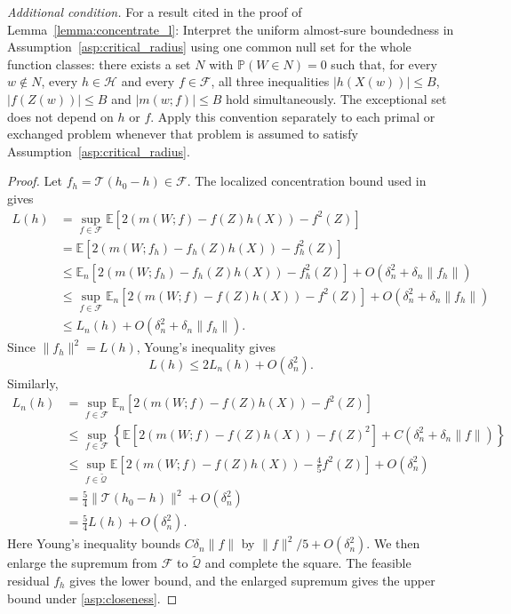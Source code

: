 \emph{Additional condition.} For a result cited in the proof of Lemma~\ref{lemma:concentrate_l}: Interpret the uniform almost-sure boundedness in Assumption~\ref{asp:critical_radius} using one common null set for the whole function classes: there exists a set $N$ with $\mathbb P(W\in N)=0$ such that, for every $w\notin N$, every $h\in\mathcal H$ and every $f\in\mathcal F$, all three inequalities $|h(X(w))|\leqslant B$, $|f(Z(w))|\leqslant B$ and $|m(w;f)|\leqslant B$ hold simultaneously. The exceptional set does not depend on $h$ or $f$. Apply this convention separately to each primal or exchanged problem whenever that problem is assumed to satisfy Assumption~\ref{asp:critical_radius}.
\begin{proof}
Let $f_h=\mathcal T(h_0-h)\in\mathcal F$.
The localized concentration bound used in \citet[Lemma~9]{bennett2023source}
gives
\begin{align*}
L( h) &=\sup_{f\in \mathcal{F}}\mathbb{E}\left[ 2( m( W;f) -f( Z) h( X)) -f^{2}( Z)\right] \\
& =\mathbb{E}\left[ 2( m( W;f_{h}) -f_{h}( Z) h( X)) -f_{h}^{2}( Z)\right]\\
 & \leqslant \mathbb{E}_{n}\left[ 2( m( W;f_{h}) -f_{h}( Z) h( X)) -f_{h}^{2}( Z)\right] +O\left( \delta _{n}^{2} +\delta _{n} \| f_{h} \| \right)\\
 & \leqslant \sup_{f\in \mathcal{F}}\mathbb{E}_{n}\left[ 2( m( W;f) -f( Z) h( X)) -f^{2}( Z)\right] +O\left( \delta _{n}^{2} +\delta _{n} \| f_{h} \| \right)\\
 & \leqslant L_{n}( h) +O\left( \delta _{n}^{2} +\delta _{n} \| f_{h} \| \right) .
\end{align*}
Since $\|f_h\|^2=L(h)$, Young's inequality gives
\[
L( h) \leqslant 2L_{n}( h) +O\left( \delta _{n}^{2}\right) .
\]
Similarly, 
\begin{align*}
L_{n}( h)&  =\sup_{f\in \mathcal{F}}\mathbb{E}_{n}\left[ 2( m( W;f) -f( Z) h( X)) -f^{2}( Z)\right] \\
 & \leqslant \sup_{f\in\mathcal F}\left\{\mathbb E\left[2(m(W;f)-f(Z)h(X))-f(Z)^2\right]+C\left(\delta_n^2+\delta_n\|f\|\right)\right\}\\
 & \leqslant \sup_{f\in\widetilde{\mathcal Q}}\mathbb{E}\left[ 2( m( W;f) -f( Z) h( X)) -\frac{4}{5} f^{2}( Z)\right] +O\left( \delta _{n}^{2}\right)\\
 & =\frac{5}{4}\|\mathcal T(h_0-h)\|^2+O\left( \delta _{n}^{2}\right)\\
 & =\frac{5}{4} L( h) +O\left( \delta _{n}^{2}\right) .
\end{align*}
Here Young's inequality bounds $C\delta_n\|f\|$ by $\|f\|^2/5+O(\delta_n^2)$. We then enlarge the supremum from $\mathcal F$ to $\widetilde{\mathcal Q}$ and complete the square. The feasible residual $f_h$ gives the lower bound, and the enlarged supremum gives the upper bound under \cref{asp:closeness}.
\end{proof}

